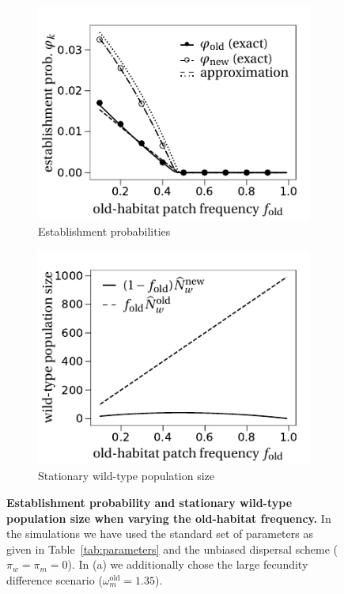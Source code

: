 \documentclass[a4paper,11pt]{scrartcl}
\begin{document}
\begin{figure}[h!]
	\centering
	\begin{subfigure}{.5\textwidth}
  		\centering
  		\includegraphics[width=\linewidth]{figS3a.pdf}
  		\caption{Establishment probabilities}
	\end{subfigure}%
	\begin{subfigure}{.5\textwidth}
 		 \centering
 		 \includegraphics[width=\linewidth]{figS3b.pdf}
  	\caption{Stationary wild-type population size}
	\end{subfigure}
	\caption{\textbf{Establishment probability and stationary wild-type population size when varying the old-habitat frequency.} In the simulations we have used the standard set of parameters as given in Table~\ref{tab:parameters} and the unbiased dispersal scheme ($\pi_w=\pi_m=0$). In (a) we additionally chose the large fecundity difference scenario ($\omega^\text{old}_m=1.35$).}
	\label{Sfig:vary_f_origin}
\end{figure}
\end{document}
